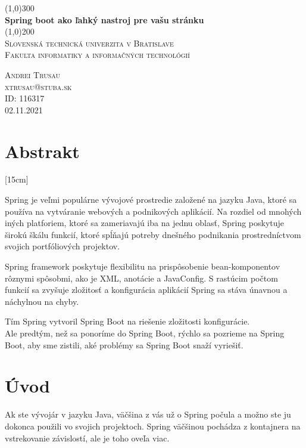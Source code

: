 \documentclass[12pt, letterpaper]{article}
\begin{document}
\begin{titlepage}
	\begin{center}	
	\line(1,0){300} \\
	[0.25in]
	\huge{\bfseries \huge Spring boot ako ľahký nastroj pre vašu stránku} \\
	[2mm]
	\line(1,0){200} \\
	[2cm]
	\textsc{\large Slovenská technická univerzita v Bratislave \\ Fakulta informatiky a informačných technológií} \\
	[8cm]
	\end{center}
	\begin{flushright}
	\textsc{\large Andrei Trusau \\ xtrusau@stuba.sk\\ ID: 116317 \\ 02.11.2021 \\}
	\end{flushright}
\end{titlepage}

\section{Abstrakt}\label{sec:intro}[15cm]

Spring je veľmi populárne vývojové prostredie založené na jazyku Java, ktoré sa používa na vytváranie webových a podnikových aplikácií. Na rozdiel od mnohých iných platforiem, ktoré sa zameriavajú iba na jednu oblasť, Spring poskytuje širokú škálu funkcií, ktoré spĺňajú potreby dnešného podnikania prostredníctvom svojich portfóliových projektov.

Spring framework poskytuje flexibilitu na prispôsobenie bean-komponentov rôznymi spôsobmi, ako je XML, anotácie a JavaConfig. S rastúcim počtom funkcií sa zvyšuje zložitosť a konfigurácia aplikácií Spring sa stáva únavnou a náchylnou na chyby.

Tím Spring vytvoril Spring Boot na riešenie zložitosti konfigurácie. \\

Ale predtým, než sa ponoríme do Spring Boot, rýchlo sa pozrieme na Spring Boot, aby sme zistili, aké problémy sa Spring Boot snaží vyriešiť.\\
[15cm]
\section{Úvod}
Ak ste vývojár v jazyku Java, väčšina z vás už o Spring počula a možno ste ju dokonca použili vo svojich projektoch. Spring väčšinou pochádza z kontajnera na vstrekovanie závislostí, ale je toho oveľa viac.
\end{document}
